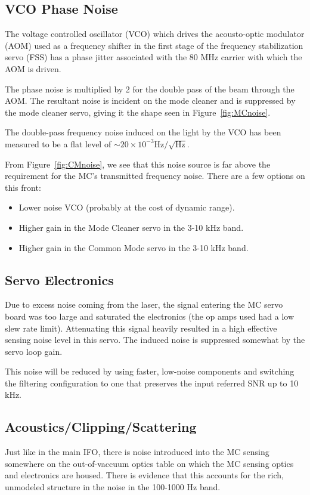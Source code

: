 \subsection{VCO Phase Noise}
The voltage controlled oscillator (VCO) which drives the acousto-optic
modulator (AOM) used as a frequency shifter in the first stage of the
frequency stabilization servo (FSS) has a phase jitter associated with
the 80 MHz carrier with which the AOM is driven.

The phase noise is multiplied by 2 for the double pass of the beam through
the AOM. The resultant noise is incident on the mode cleaner and is suppressed
by the mode cleaner servo, giving it the shape seen in Figure~\ref{fig:MCnoise}.

The double-pass frequency noise induced on the light by the VCO has been measured
to be a flat level of $\sim20 \times 10^{-3} \mbox{Hz}/\sqrt{\mbox{Hz}}$.

From Figure~\ref{fig:CMnoise}, we see that this noise source is far above the
requirement for the MC's transmitted frequency noise. There are a few options
on this front:

\begin{itemize}
\item Lower noise VCO (probably at the cost of dynamic range).

\item Higher gain in the Mode Cleaner servo in the 3-10 kHz band.

\item Higher gain in the Common Mode servo in the 3-10 kHz band.
\end{itemize}


\subsection{Servo Electronics}
Due to excess noise coming from the laser, the signal entering the MC servo
board was too large and saturated the electronics (the op amps used had a 
low slew rate limit). Attenuating this signal heavily resulted in a high
effective sensing noise level in this servo. The induced noise is
suppressed somewhat by the servo loop gain.

This noise will be reduced by using faster, low-noise components and switching
the filtering configuration to one that preserves the input referred 
SNR up to 10 kHz.


\subsection{Acoustics/Clipping/Scattering}
Just like in the main IFO, there is noise introduced into the MC sensing
somewhere on the out-of-vaccuum optics table on which the MC sensing
optics and electronics are housed. There is evidence that this accounts for
the rich, unmodeled structure in the noise in the 100-1000 Hz band.

